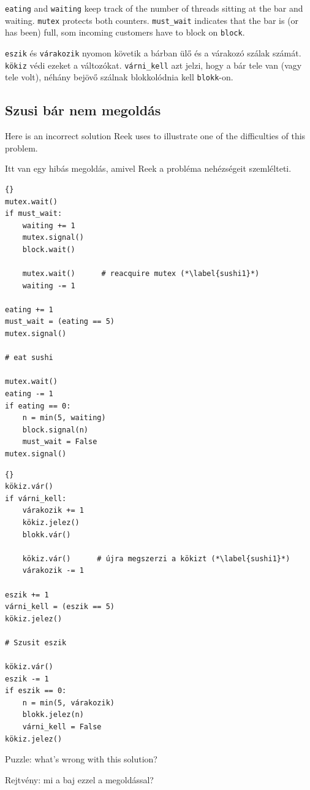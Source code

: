 \documentclass{book}
\newcommand{\clearemptydoublepage}{\newpage\cleardoublepage}
\begin{document}
{\tt eating} and {\tt waiting} keep track of the number of
threads sitting at the bar and waiting.  {\tt mutex} protects
both counters.  {\tt must\_wait} indicates that the bar is (or
has been) full, som incoming customers have to block
on {\tt block}.

{\tt eszik} és {\tt várakozik} nyomon követik a bárban ülő
és a várakozó szálak számát.  {\tt kökiz} védi ezeket a
változókat.  {\tt várni\_kell} azt jelzi, hogy a bár tele van
(vagy tele volt), néhány bejövő szálnak blokkolódnia kell {\tt blokk}-on.

\clearemptydoublepage
\subsection{Szusi bár nem megoldás}

Here is an incorrect solution Reek uses to illustrate one
of the difficulties of this problem.

Itt van egy hibás megoldás, amivel Reek a probléma nehézségeit
szemlélteti.

\begin{lstlisting}[title={Sushi bar non-solution}]{}
mutex.wait()
if must_wait:
    waiting += 1
    mutex.signal()
    block.wait()

    mutex.wait()      # reacquire mutex (*\label{sushi1}*)
    waiting -= 1

eating += 1
must_wait = (eating == 5)
mutex.signal()

# eat sushi

mutex.wait()
eating -= 1
if eating == 0:
    n = min(5, waiting)
    block.signal(n)
    must_wait = False
mutex.signal()
\end{lstlisting}

\begin{lstlisting}[title={Szusi bár nem megoldás}]{}
kökiz.vár()
if várni_kell:
    várakozik += 1
    kökiz.jelez()
    blokk.vár()

    kökiz.vár()      # újra megszerzi a kökizt (*\label{sushi1}*)
    várakozik -= 1

eszik += 1
várni_kell = (eszik == 5)
kökiz.jelez()

# Szusit eszik

kökiz.vár()
eszik -= 1
if eszik == 0:
    n = min(5, várakozik)
    blokk.jelez(n)
    várni_kell = False
kökiz.jelez()
\end{lstlisting}

Puzzle: what's wrong with this solution?

Rejtvény: mi a baj ezzel a megoldással?
\end{document}

